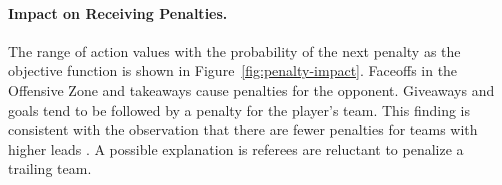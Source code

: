 \documentclass[]{article}
\begin{document}


\paragraph{Impact on Receiving Penalties.}
The range of action values with the probability of the next penalty as the objective function is shown in Figure~\ref{fig:penalty-impact}.
Faceoffs in the Offensive Zone and takeaways cause penalties for the opponent. Giveaways and goals tend to be followed by a penalty for the player's team. This finding is consistent with the observation that there are fewer penalties for teams with higher leads \citep{Schuckers2012}. A possible explanation is referees are reluctant to penalize a trailing team.
\end{document}
